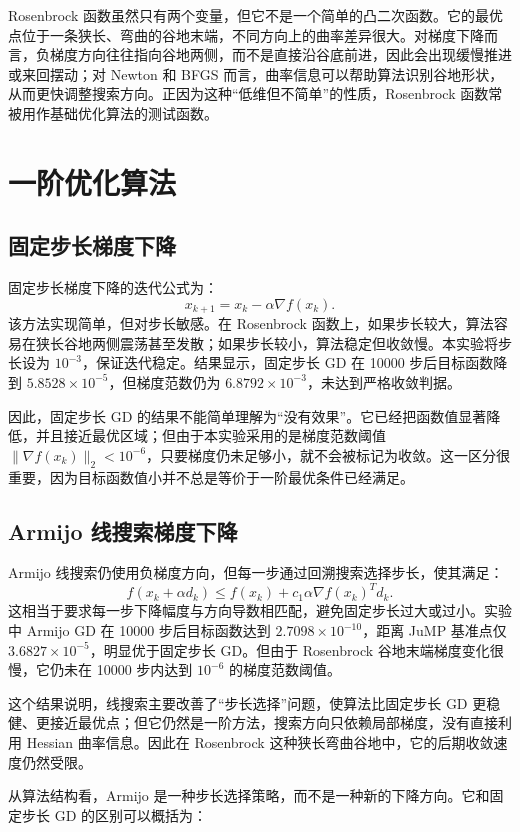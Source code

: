 \documentclass[UTF8,a4paper,12pt,fontset=none]{ctexart}
\begin{document}
Rosenbrock 函数虽然只有两个变量，但它不是一个简单的凸二次函数。它的最优点位于一条狭长、弯曲的谷地末端，不同方向上的曲率差异很大。对梯度下降而言，负梯度方向往往指向谷地两侧，而不是直接沿谷底前进，因此会出现缓慢推进或来回摆动；对 Newton 和 BFGS 而言，曲率信息可以帮助算法识别谷地形状，从而更快调整搜索方向。正因为这种“低维但不简单”的性质，Rosenbrock 函数常被用作基础优化算法的测试函数。

\section{一阶优化算法}

\subsection{固定步长梯度下降}

固定步长梯度下降的迭代公式为：
\[
x_{k+1}=x_k-\alpha\nabla f(x_k).
\]
该方法实现简单，但对步长敏感。在 Rosenbrock 函数上，如果步长较大，算法容易在狭长谷地两侧震荡甚至发散；如果步长较小，算法稳定但收敛慢。本实验将步长设为 $10^{-3}$，保证迭代稳定。结果显示，固定步长 GD 在 10000 步后目标函数降到 $5.8528\times10^{-5}$，但梯度范数仍为 $6.8792\times10^{-3}$，未达到严格收敛判据。

因此，固定步长 GD 的结果不能简单理解为“没有效果”。它已经把函数值显著降低，并且接近最优区域；但由于本实验采用的是梯度范数阈值 $\|\nabla f(x_k)\|_2<10^{-6}$，只要梯度仍未足够小，就不会被标记为收敛。这一区分很重要，因为目标函数值小并不总是等价于一阶最优条件已经满足。

\subsection{Armijo 线搜索梯度下降}

Armijo 线搜索仍使用负梯度方向，但每一步通过回溯搜索选择步长，使其满足：
\[
f(x_k+\alpha d_k)\le f(x_k)+c_1\alpha\nabla f(x_k)^Td_k.
\]
这相当于要求每一步下降幅度与方向导数相匹配，避免固定步长过大或过小。实验中 Armijo GD 在 10000 步后目标函数达到 $2.7098\times10^{-10}$，距离 JuMP 基准点仅 $3.6827\times10^{-5}$，明显优于固定步长 GD。但由于 Rosenbrock 谷地末端梯度变化很慢，它仍未在 10000 步内达到 $10^{-6}$ 的梯度范数阈值。

这个结果说明，线搜索主要改善了“步长选择”问题，使算法比固定步长 GD 更稳健、更接近最优点；但它仍然是一阶方法，搜索方向只依赖局部梯度，没有直接利用 Hessian 曲率信息。因此在 Rosenbrock 这种狭长弯曲谷地中，它的后期收敛速度仍然受限。

从算法结构看，Armijo 是一种步长选择策略，而不是一种新的下降方向。它和固定步长 GD 的区别可以概括为：
\end{document}
